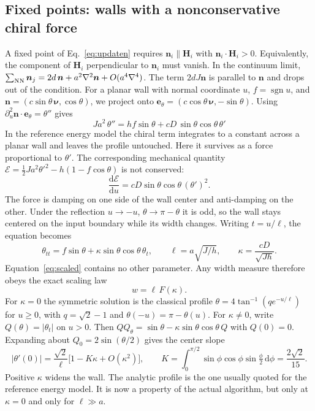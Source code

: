 \documentclass[11pt,a4paper]{article}
\newcommand{\nn}{\bm n}
\newcommand{\dd}{\mathrm{d}}
\begin{document}
\subsection{Fixed points: walls with a nonconservative chiral force}\label{subsec:fixedpoint}
A fixed point of Eq.~\eqref{eq:updaten} requires $\nn_i\parallel\bm H_i$ with $\nn_i\cdot\bm H_i>0$. Equivalently, the component of $\bm H_i$ perpendicular to $\nn_i$ must vanish. In the continuum limit, $\sum_{\rm NN}\nn_j=2d\,\nn+a^2\nabla^2\nn+O(a^4\nabla^4)$. The term $2dJ\nn$ is parallel to $\nn$ and drops out of the condition. For a planar wall with normal coordinate $u$, $f=\operatorname{sgn}u$, and $\nn=(c\sin\theta\,\bm\nu,\cos\theta)$, we project onto $\bm e_\theta=(c\cos\theta\,\bm\nu,-\sin\theta)$. Using $\partial_u^2\nn\cdot\bm e_\theta=\theta''$ gives
\begin{equation}
 \boxed{\;Ja^2\,\theta''=h f\sin\theta+cD\,\sin\theta\cos\theta\,\theta'\;}
 \label{eq:fixedODE}
\end{equation}
In the reference energy model the chiral term integrates to a constant across a planar wall and leaves the profile untouched. Here it survives as a force proportional to $\theta'$. The corresponding mechanical quantity $\mathcal E=\tfrac12Ja^2\theta'^2-h(1-f\cos\theta)$ is not conserved:
\begin{equation}
 \frac{\dd\mathcal E}{\dd u}=cD\sin\theta\cos\theta\,(\theta')^2 .
\end{equation}
The force is damping on one side of the wall center and anti-damping on the other. Under the reflection $u\to-u$, $\theta\to\pi-\theta$ it is odd, so the wall stays centered on the input boundary while its width changes. Writing $t=u/\ell$, the equation becomes
\begin{equation}
 \theta_{tt}=f\sin\theta+\kappa\sin\theta\cos\theta\,\theta_t,\qquad
 \ell=a\sqrt{J/h},\qquad \kappa=\frac{cD}{\sqrt{Jh}} .
 \label{eq:scaled}
\end{equation}
Equation~\eqref{eq:scaled} contains no other parameter. Any width measure therefore obeys the exact scaling law
\begin{equation}
 w=\ell\,F(\kappa).
 \label{eq:collapse}
\end{equation}
For $\kappa=0$ the symmetric solution is the classical profile $\theta=4\tan^{-1}(qe^{-u/\ell})$ for $u\ge0$, with $q=\sqrt2-1$ and $\theta(-u)=\pi-\theta(u)$. For $\kappa\neq0$, write $Q(\theta)=|\theta_t|$ on $u>0$. Then $QQ_\theta=\sin\theta-\kappa\sin\theta\cos\theta\,Q$ with $Q(0)=0$. Expanding about $Q_0=2\sin(\theta/2)$ gives the center slope
\begin{equation}
 |\theta'(0)|=\frac{\sqrt2}{\ell}\bigl[1-K\kappa+O(\kappa^2)\bigr],\qquad
 K=\int_0^{\pi/2}\!\sin\phi\cos\phi\sin\tfrac{\phi}{2}\,\dd\phi=\frac{2\sqrt2}{15}.
 \label{eq:slope}
\end{equation}
Positive $\kappa$ widens the wall. The analytic profile is the one usually quoted for the reference energy model. It is now a property of the actual algorithm, but only at $\kappa=0$ and only for $\ell\gg a$.
\end{document}

